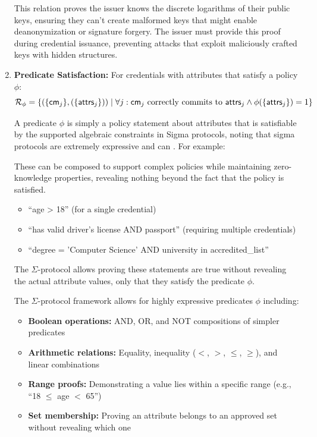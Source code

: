 \begin{enumerate}
    This relation proves the issuer knows the discrete logarithms of their public keys, ensuring they can't create malformed keys that might enable deanonymization or signature forgery. The issuer must provide this proof during credential issuance, preventing attacks that exploit maliciously crafted keys with hidden structures.     

     \item \textbf{Predicate Satisfaction:} For credentials with attributes that satisfy a policy $\phi$:
    \[
    \mathcal{R}_{\phi} = \{(\{\mathsf{cm}_j\}, (\{\mathsf{attrs}_j\})) \mid \forall j: \mathsf{cm}_j \text{ correctly commits to } \mathsf{attrs}_j \wedge
    \phi(\{\mathsf{attrs}_j\}) = 1 \}
    \]
    
    A predicate $\phi$ is simply a policy statement about attributes that is satisfiable by the supported algebraic constraints in Sigma protocols, noting that sigma protocols are extremely expressive and can  . For example:

    These can be composed to support complex policies while maintaining zero-knowledge properties, revealing nothing beyond the fact that the policy is satisfied.
    \begin{itemize}
    \item ``age > 18'' (for a single credential)
    \item ``has valid driver's license AND passport'' (requiring multiple credentials)
    \item ``degree = 'Computer Science' AND university in accredited\_list''
    \end{itemize}
    
    The $\Sigma$-protocol allows proving these statements are true without revealing the actual attribute values, only that they satisfy the predicate $\phi$.

    The $\Sigma$-protocol framework allows for highly expressive predicates $\phi$ including:
    \begin{itemize}
    \item \textbf{Boolean operations:} AND, OR, and NOT compositions of simpler predicates
    \item \textbf{Arithmetic relations:} Equality, inequality ($<$, $>$, $\leq$, $\geq$), and linear combinations 
    \item \textbf{Range proofs:} Demonstrating a value lies within a specific range (e.g., ``18 $\leq$ age $<$ 65'')
    \item \textbf{Set membership:} Proving an attribute belongs to an approved set without revealing which one
    \end{itemize}

    
\end{enumerate}


